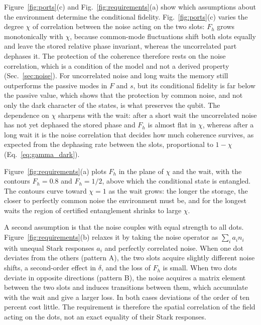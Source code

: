 \documentclass[aps,pra,preprint,groupedaddress,amsmath,amssymb,floatfix]{revtex4-2}
\begin{document}
Figure~\ref{fig:ports}(c) and Fig.~\ref{fig:requirements}(a) show which assumptions about the environment determine the conditional fidelity. Fig.~\ref{fig:ports}(c) varies the degree $\chi$ of correlation between the noise acting on the two slots: $F_h$ grows monotonically with $\chi$, because common-mode fluctuations shift both slots equally and leave the stored relative phase invariant, whereas the uncorrelated part dephases it. The protection of the coherence therefore rests on the noise correlation, which is a condition of the model and not a derived property (Sec.~\ref{sec:noise}). For uncorrelated noise and long waits the memory still outperforms the passive modes in $F$ and $s$, but its conditional fidelity is far below the passive value, which shows that the protection by common noise, and not only the dark character of the states, is what preserves the qubit. The dependence on $\chi$ sharpens with the wait: after a short wait the uncorrelated noise has not yet dephased the stored phase and $F_h$ is almost flat in $\chi$, whereas after a long wait it is the noise correlation that decides how much coherence survives, as expected from the dephasing rate between the slots, proportional to $1-\chi$ (Eq.~\eqref{eq:gamma_dark}).

Figure~\ref{fig:requirements}(a) plots $F_h$ in the plane of $\chi$ and the wait, with the contours $F_h=0.8$ and $F_h=1/2$, above which the conditional state is entangled. The contours curve toward $\chi=1$ as the wait grows: the longer the storage, the closer to perfectly common noise the environment must be, and for the longest waits the region of certified entanglement shrinks to large $\chi$.

A second assumption is that the noise couples with equal strength to all dots. Figure~\ref{fig:requirements}(b) relaxes it by taking the noise operator as $\sum_i a_i n_i$ with unequal Stark responses $a_i$ and perfectly correlated noise. When one dot deviates from the others (pattern A), the two slots acquire slightly different noise shifts, a second-order effect in $\delta$, and the loss of $F_h$ is small. When two dots deviate in opposite directions (pattern B), the noise acquires a matrix element between the two slots and induces transitions between them, which accumulate with the wait and give a larger loss. In both cases deviations of the order of ten percent cost little. The requirement is therefore the spatial correlation of the field acting on the dots, not an exact equality of their Stark responses.
\end{document}
